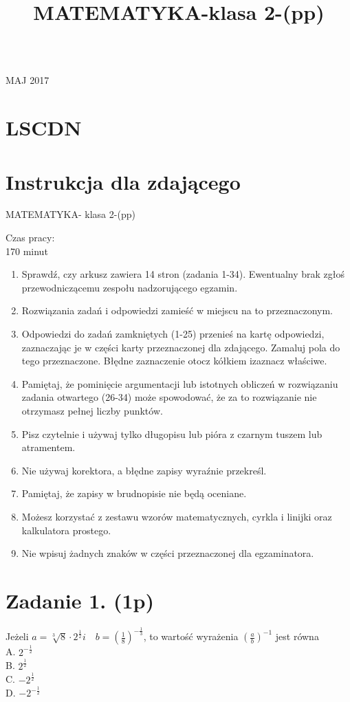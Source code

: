 \documentclass[10pt]{article}
\title{MATEMATYKA-klasa 2-(pp) }
\author{}
\date{}
\begin{document}
\maketitle
\(\qquad\)

MAJ 2017

\section*{LSCDN}
\section*{Instrukcja dla zdającego}
MATEMATYKA- klasa 2-(pp)

Czas pracy:\\
170 minut

\begin{enumerate}
  \item Sprawdź, czy arkusz zawiera 14 stron (zadania 1-34). Ewentualny brak zgłoś przewodniczącemu zespołu nadzorującego egzamin.
  \item Rozwiązania zadań i odpowiedzi zamieść w miejscu na to przeznaczonym.
  \item Odpowiedzi do zadań zamkniętych (1-25) przenieś na kartę odpowiedzi, zaznaczając je w części karty przeznaczonej dla zdającego. Zamaluj pola do tego przeznaczone. Błędne zaznaczenie otocz kółkiem izaznacz właściwe.
  \item Pamiętaj, że pominięcie argumentacji lub istotnych obliczeń w rozwiązaniu zadania otwartego (26-34) może spowodować, że za to rozwiązanie nie otrzymasz pełnej liczby punktów.
  \item Pisz czytelnie i używaj tylko długopisu lub pióra z czarnym tuszem lub atramentem.
  \item Nie używaj korektora, a błędne zapisy wyraźnie przekreśl.
  \item Pamiętaj, że zapisy w brudnopisie nie będą oceniane.
  \item Możesz korzystać z zestawu wzorów matematycznych, cyrkla i linijki oraz kalkulatora prostego.
  \item Nie wpisuj żadnych znaków w części przeznaczonej dla egzaminatora.
\end{enumerate}

\section*{Zadanie 1. (1p)}
Jeżeli \(a=\sqrt[3]{8} \cdot 2^{\frac{1}{2}} i \quad b=\left(\frac{1}{8}\right)^{-\frac{1}{3}}\), to wartość wyrażenia \(\left(\frac{a}{b}\right)^{-1}\) jest równa\\
A. \(2^{-\frac{1}{2}}\)\\
B. \(2^{\frac{1}{2}}\)\\
C. \(-2^{\frac{1}{2}}\)\\
D. \(-2^{-\frac{1}{2}}\)
\end{document}
